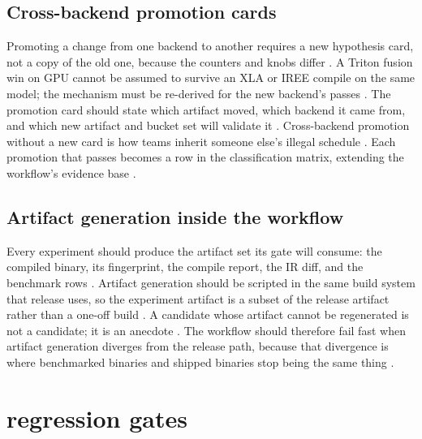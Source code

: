 \subsection{Cross-backend promotion cards}

Promoting a change from one backend to another requires a new hypothesis card, not a copy of the old one, because the counters and knobs differ \citep{chen2020compilerbasedhardw,patel2025llminference,taxbreak2026}. A Triton fusion win on GPU cannot be assumed to survive an XLA or IREE compile on the same model; the mechanism must be re-derived for the new backend's passes \citep{iree2024,chen2018tvm,memoryfloor2026}. The promotion card should state which artifact moved, which backend it came from, and which new artifact and bucket set will validate it \citep{chen2020compilerbasedhardw,patel2025llminference}. Cross-backend promotion without a new card is how teams inherit someone else's illegal schedule \citep{memoryfloor2026,taxbreak2026}. Each promotion that passes becomes a row in the classification matrix, extending the workflow's evidence base \citep{patel2025llminference,memoryfloor2026}.

\subsection{Artifact generation inside the workflow}

Every experiment should produce the artifact set its gate will consume: the compiled binary, its fingerprint, the compile report, the IR diff, and the benchmark rows \citep{chen2020compilerbasedhardw,memoryfloor2026,taxbreak2026}. Artifact generation should be scripted in the same build system that release uses, so the experiment artifact is a subset of the release artifact rather than a one-off build \citep{patel2025llminference,memoryfloor2026}. A candidate whose artifact cannot be regenerated is not a candidate; it is an anecdote \citep{chen2020compilerbasedhardw,taxbreak2026}. The workflow should therefore fail fast when artifact generation diverges from the release path, because that divergence is where benchmarked binaries and shipped binaries stop being the same thing \citep{patel2025llminference,memoryfloor2026}.

\section{regression gates}
\label{sec:ch22_regression_gates}

